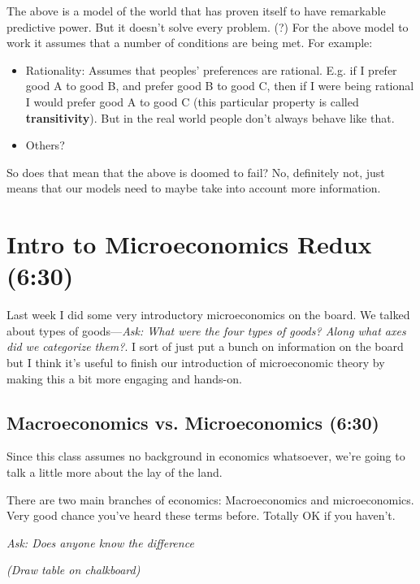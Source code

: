 \documentclass[11pt]{article}
\begin{document}
The above is a model of the world that has proven itself to have remarkable predictive power.
But it doesn't solve every problem. (?)
For the above model to work it assumes that a number of conditions are being met. For example:

\begin{itemize}
    \item Rationality: Assumes that peoples' preferences are rational. E.g. if I prefer good A to good B, and prefer good B to good C, then if I were being rational I would prefer good A to good C (this particular property is called {\bf transitivity}). But in the real world people don't always behave like that.
    \item Others? 
\end{itemize}

So does that mean that the above is doomed to fail? No, definitely not, just means that our models need to maybe take into account more information.


\section{Intro to Microeconomics Redux (6:30)}

Last week I did some very introductory microeconomics on the board. We talked about types of goods---{\it Ask: What were the four types of goods? Along what axes did we categorize them?}. I sort of just put a bunch on information on the board but I think it's useful to finish our introduction of microeconomic theory by making this a bit more engaging and hands-on.

\subsection{Macroeconomics vs. Microeconomics (6:30)}

Since this class assumes no background in economics whatsoever, we're going to talk a little more about the lay of the land. 

There are two main branches of economics: Macroeconomics and microeconomics. Very good chance you've heard these terms before. Totally OK if you haven't.

{\it Ask: Does anyone know the difference}

{\it (Draw table on chalkboard)}
\end{document}
